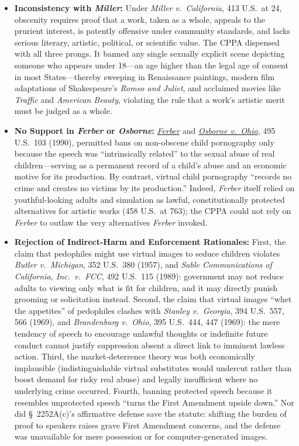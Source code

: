 \documentclass[12pt]{article}
\begin{document}
\begin{itemize}
\item \textbf{Inconsistency with \textit{Miller}:} Under \textit{Miller v.\ California}, 413 U.S.\ at 24, obscenity requires proof that a work, taken as a whole, appeals to the prurient interest, is patently offensive under community standards, and lacks serious literary, artistic, political, or scientific value. The CPPA dispensed with all three prongs. It banned any single sexually explicit scene depicting someone who appears under 18---an age higher than the legal age of consent in most States---thereby sweeping in Renaissance paintings, modern film adaptations of Shakespeare's \textit{Romeo and Juliet}, and acclaimed movies like \textit{Traffic} and \textit{American Beauty}, violating the rule that a work's artistic merit must be judged as a whole.
\item \textbf{No Support in \textit{Ferber} or \textit{Osborne}:} \href{https://supreme.justia.com/cases/federal/us/458/747/}{\textit{Ferber}} and \href{https://supreme.justia.com/cases/federal/us/495/103/}{\textit{Osborne v.\ Ohio}}, 495 U.S.\ 103 (1990), permitted bans on non-obscene child pornography only because the speech was ``intrinsically related'' to the sexual abuse of real children---serving as a permanent record of a child's abuse and an economic motive for its production. By contrast, virtual child pornography ``records no crime and creates no victims by its production.'' Indeed, \textit{Ferber} itself relied on youthful-looking adults and simulation as lawful, constitutionally protected alternatives for artistic works (458 U.S.\ at 763); the CPPA could not rely on \textit{Ferber} to outlaw the very alternatives \textit{Ferber} invoked.
\item \textbf{Rejection of Indirect-Harm and Enforcement Rationales:} First, the claim that pedophiles might use virtual images to seduce children violates \textit{Butler v.\ Michigan}, 352 U.S.\ 380 (1957), and \textit{Sable Communications of California, Inc.\ v.\ FCC}, 492 U.S.\ 115 (1989): government may not reduce adults to viewing only what is fit for children, and it may directly punish grooming or solicitation instead. Second, the claim that virtual images ``whet the appetites'' of pedophiles clashes with \textit{Stanley v.\ Georgia}, 394 U.S.\ 557, 566 (1969), and \textit{Brandenburg v.\ Ohio}, 395 U.S.\ 444, 447 (1969): the mere tendency of speech to encourage unlawful thoughts or indefinite future conduct cannot justify suppression absent a direct link to imminent lawless action. Third, the market-deterrence theory was both economically implausible (indistinguishable virtual substitutes would undercut rather than boost demand for risky real abuse) and legally insufficient where no underlying crime occurred. Fourth, banning protected speech because it resembles unprotected speech ``turns the First Amendment upside down.'' Nor did \S~2252A(c)'s affirmative defense save the statute: shifting the burden of proof to speakers raises grave First Amendment concerns, and the defense was unavailable for mere possession or for computer-generated images.

\end{itemize}
\end{document}
